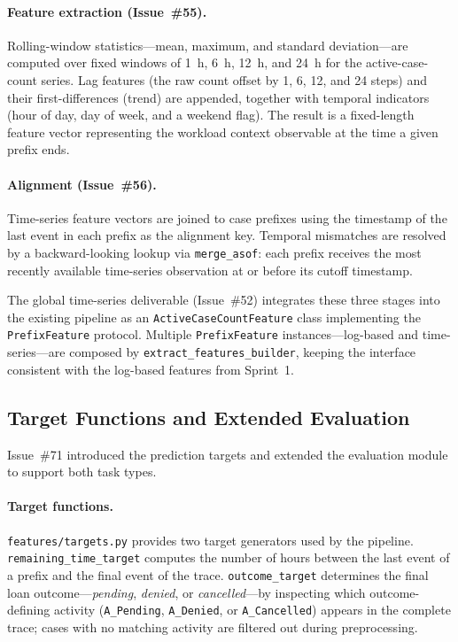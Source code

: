 \documentclass[runningheads]{llncs}
\begin{document}
\paragraph{Feature extraction (Issue~\#55).} Rolling-window statistics---mean, maximum, and standard deviation---are computed over fixed windows of 1~h, 6~h, 12~h, and 24~h for the active-case-count series. Lag features (the raw count offset by 1, 6, 12, and 24 steps) and their first-differences (trend) are appended, together with temporal indicators (hour of day, day of week, and a weekend flag). The result is a fixed-length feature vector representing the workload context observable at the time a given prefix ends.

\paragraph{Alignment (Issue~\#56).} Time-series feature vectors are joined to case prefixes using the timestamp of the last event in each prefix as the alignment key. Temporal mismatches are resolved by a backward-looking lookup via \texttt{merge\_asof}: each prefix receives the most recently available time-series observation at or before its cutoff timestamp.

The global time-series deliverable (Issue~\#52) integrates these three stages into the existing pipeline as an \texttt{ActiveCaseCountFeature} class implementing the \texttt{PrefixFeature} protocol. Multiple \texttt{PrefixFeature} instances---log-based and time-series---are composed by \texttt{extract\_features\_builder}, keeping the interface consistent with the log-based features from Sprint~1.

\subsection{Target Functions and Extended Evaluation}

Issue~\#71 introduced the prediction targets and extended the evaluation module to support both task types.

\paragraph{Target functions.} \texttt{features/targets.py} provides two target generators used by the pipeline. \texttt{remaining\_time\_target} computes the number of hours between the last event of a prefix and the final event of the trace. \texttt{outcome\_target} determines the final loan outcome---\emph{pending}, \emph{denied}, or \emph{cancelled}---by inspecting which outcome-defining activity (\texttt{A\_Pending}, \texttt{A\_Denied}, or \texttt{A\_Cancelled}) appears in the complete trace; cases with no matching activity are filtered out during preprocessing.
\end{document}
